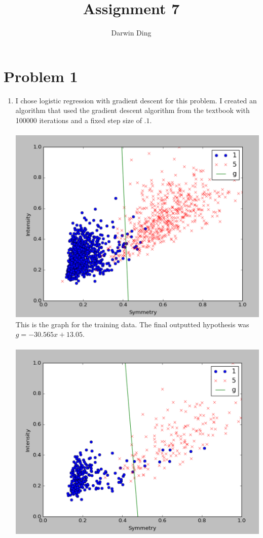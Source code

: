 \documentclass[12pt]{article}
\begin{document}
\title{Assignment 7}
\author{Darwin Ding}
\maketitle

\section*{Problem 1}
\begin{enumerate}[label=(\alph*)]
	\item I chose logistic regression with gradient descent for this problem. I created an algorithm that used the gradient descent algorithm from the textbook with 100000 iterations and a fixed step size of $.1$.
	\\ \\ \includegraphics[scale=.75]{1a1.png}
	\\ This is the graph for the training data. The final outputted hypothesis was $g = -30.565x + 13.05$.
	\\ \\ \includegraphics[scale=.75]{1a2.png}

\end{enumerate}
\end{document}
